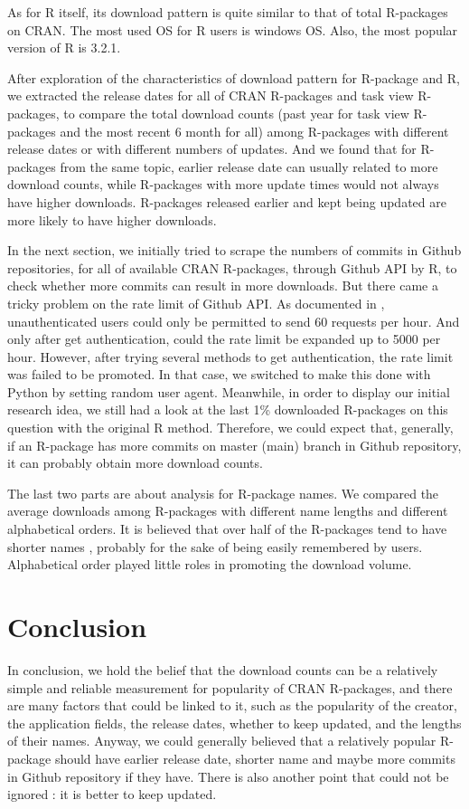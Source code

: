 \documentclass[
]{book}
\begin{document}
As for R itself, its download pattern is quite similar to that of total R-packages on CRAN. The most used OS for R users is windows OS. Also, the most popular version of R is 3.2.1.

After exploration of the characteristics of download pattern for R-package and R, we extracted the release dates for all of CRAN R-packages and task view R-packages, to compare the total download counts (past year for task view R-packages and the most recent 6 month for all) among R-packages with different release dates or with different numbers of updates. And we found that for R-packages from the same topic, earlier release date can usually related to more download counts, while R-packages with more update times would not always have higher downloads. R-packages released earlier and kept being updated are more likely to have higher downloads.

In the next section, we initially tried to scrape the numbers of commits in Github repositories, for all of available CRAN R-packages, through Github API by R, to check whether more commits can result in more downloads. But there came a tricky problem on the rate limit of Github API. As documented in \citet{githubapi}, unauthenticated users could only be permitted to send 60 requests per hour. And only after get authentication, could the rate limit be expanded up to 5000 per hour. However, after trying several methods to get authentication, the rate limit was failed to be promoted. In that case, we switched to make this done with Python by setting random user agent. Meanwhile, in order to display our initial research idea, we still had a look at the last 1\% downloaded R-packages on this question with the original R method. Therefore, we could expect that, generally, if an R-package has more commits on master (main) branch in Github repository, it can probably obtain more download counts.

The last two parts are about analysis for R-package names. We compared the average downloads among R-packages with different name lengths and different alphabetical orders. It is believed that over half of the R-packages tend to have shorter names , probably for the sake of being easily remembered by users. Alphabetical order played little roles in promoting the download volume.

\hypertarget{conclusion}{%
\chapter{Conclusion}\label{conclusion}}

In conclusion, we hold the belief that the download counts can be a relatively simple and reliable measurement for popularity of CRAN R-packages, and there are many factors that could be linked to it, such as the popularity of the creator, the application fields, the release dates, whether to keep updated, and the lengths of their names. Anyway, we could generally believed that a relatively popular R-package should have earlier release date, shorter name and maybe more commits in Github repository if they have. There is also another point that could not be ignored : it is better to keep updated.

  
\end{document}
